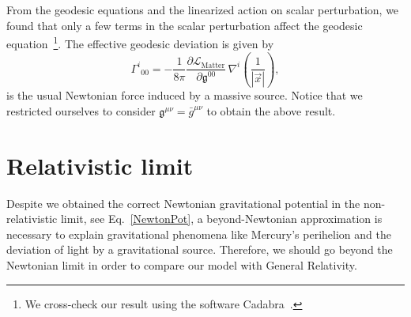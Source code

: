 \documentclass[aps,prd,12pt,twocolumn,superscriptaddress,showpacs,showkeys,reprint,longbibliography]{revtex4-1}
\renewcommand{\(}{\left(}
\renewcommand{\)}{\right)}
\renewcommand{\[}{\left[}
\renewcommand{\]}{\right]}
\begin{document}
From the geodesic equations and the linearized action on scalar perturbation, we found that only a few terms in the scalar perturbation affect the geodesic equation~\footnote{We cross-check our result using the software Cadabra~\cite{Peeters2007550,peeters2007symbolic,Peeters:2007wn}.}. The effective geodesic deviation is given by
\begin{equation}
  \label{NewtonPot}
  \Gamma^i{}_{00} = - \frac{1}{8\pi} \frac{ \partial\mathcal{L}_{\text{Matter}} }{ \partial \mathfrak{g}^{00} } \, \nabla^i \left(\frac{1}{|\vec{x}|}\right),
\end{equation}
is the usual Newtonian force induced by a massive source. Notice that we restricted ourselves to consider $\mathfrak{g}^{\mu \nu} = \bar{g}^{\mu\nu}$ to obtain the above result.


\section{\label{rlimit}Relativistic limit}
Despite we obtained the correct Newtonian gravitational potential in the non-relativistic limit, see Eq.~\eqref{NewtonPot}, a beyond-Newtonian approximation is necessary to explain gravitational phenomena like Mercury's perihelion and the deviation of light by a gravitational source. Therefore, we should go beyond the Newtonian limit in order to compare our model with General Relativity.
\end{document}
